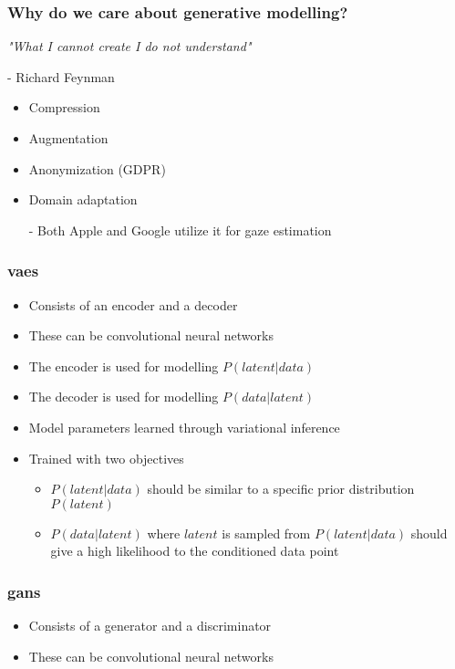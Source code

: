 \documentclass{beamer}
\begin{document}
\begin{messageframe}
    \frametitle{Why do we care about generative modelling?}
        \textit{"What I cannot create I do not understand"} 

        - Richard Feynman
    \begin{itemize}
            \item Compression
            \item Augmentation
            \item Anonymization (GDPR)
            \item Domain adaptation

            - Both Apple and Google utilize it for gaze estimation
    \end{itemize}
\end{messageframe}


\begin{messageframe}
    \frametitle{\acrfull{vaes}}
    \begin{itemize}
            \item Consists of an encoder and a decoder
            \item These can be convolutional neural networks
            \item The encoder is used for modelling $P(latent | data)$
            \item The decoder is used for modelling $P(data | latent)$
            \item Model parameters learned through variational inference
            \item Trained with two objectives
            \begin{itemize}
                \item $P(latent | data)$ should be similar to a specific prior distribution $P(latent)$
                \item $P(data | latent)$ where $latent$ is sampled from $P(latent | data)$ should give a high likelihood to the conditioned data point
            \end{itemize}
    \end{itemize}
\end{messageframe}

\begin{messageframe}
    \frametitle{\acrfull{gans}}

    \begin{itemize}
            \item Consists of a generator and a discriminator
            \item These can be convolutional neural networks
    \end{itemize}
\end{messageframe}
\end{document}
